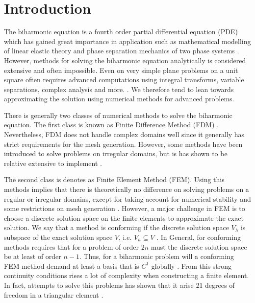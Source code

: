 \section{Introduction}\label{sec:introduction}


The biharmonic equation is a fourth order partial differential equation (PDE) which has gained great importance in
application such as mathematical modelling of linear elastic theory \cite{selvadurai13} and phase separation mechanics
of two phase systems \cite{cahnhilliard1957, kim16}. However, methods for solving the biharmonic equation analytically
is considered extensive and often impossible. Even on very simple plane problems on a unit square often requires advanced computations using integral transforms, variable separations, complex analysis and more. \cite{selvadurai13}. We therefore tend
to lean towards approximating the solution using numerical methods for advanced problems.

There is generally two classes of numerical methods to solve the biharmonic equation. The first class is known as Finite Difference Method (FDM) \cite{ehrlich75, hackbusch17}. Nevertheless, FDM does not handle complex domains well since it generally
has strict requirements for the mesh generation. However, some methods have been introduced to solve problems on irregular domains, but is has shown to be relative extensive to implement \cite{hackbusch17, chen08, belyaev18}.

The second class is denotes as Finite Element Method (FEM). Using this methods implies that there is theoretically no difference on solving problems on a regular or irregular domains, except for taking account for numerical stability and some
restrictions on mesh generation \cite{chen08}. However, a major challenge in FEM is to choose a discrete solution space on the finite elements to approximate the exact solution. We say that a method is conforming if the discrete solution space
$V_{h}$ is subspace of the exact solution space $V$\cite{shi02, brenner07math}, i.e. $V_{h} \subseteq  V$  . In General, for conforming methods requires that for a problem of order $2n$ must the discrete solution space be at least of order $n-1$. Thus, for a biharmonic problem
will a conforming FEM method demand at least a basis that is $C^1$ globally \cite{shi02}. From this strong continuity conditions rises a lot of complexity when constructing a finite element. In fact, attempts to solve this problems has shown that it
arise 21 degrees of freedom in a triangular element \cite{nair21}.

